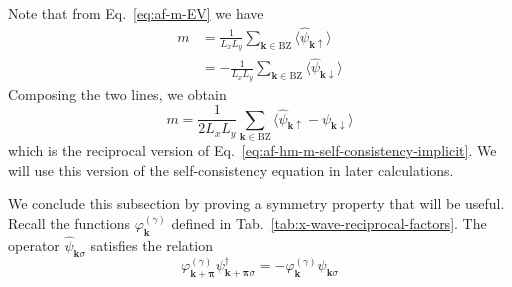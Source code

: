 Note that from Eq.~\eqref{eq:af-m-EV} we have
\begin{align}
	m &= \frac{1}{L_xL_y} \sum_{\mathbf{k}\in\mathrm{BZ}} \langle \hat \psi_{\mathbf{k}\uparrow} \rangle \label{eq:af-m-EV-up}\\
	&= -\frac{1}{L_xL_y} \sum_{\mathbf{k}\in\mathrm{BZ}} \langle \hat \psi_{\mathbf{k}\downarrow} \rangle \label{eq:af-m-EV-down}
\end{align}
Composing the two lines, we obtain
\begin{equation}
	m = \frac{1}{2L_xL_y} \sum_{\mathbf{k}\in\mathrm{BZ}} \langle \hat \psi_{\mathbf{k}\uparrow} - \psi_{\mathbf{k}\downarrow} \rangle \label{eq:af-hm-m-self-consistency-reciprocal}
\end{equation}
which is the reciprocal version of Eq.~\eqref{eq:af-hm-m-self-consistency-implicit}. We will use this version of the self-consistency equation in later calculations.

We conclude this subsection by proving a symmetry property that will be useful. Recall the functions $\varphi_\mathbf{k}^{(\gamma)}$ defined in Tab.~\ref{tab:x-wave-reciprocal-factors}. 
The operator $\hat \psi_{\mathbf{k}\sigma}$ satisfies the relation
\begin{equation}\label{eq:af-ehm-vphi-psi-property}
	\varphi_{\mathbf{k}+\bm{\pi}}^{(\gamma)} \psi_{\mathbf{k}+\bm{\pi}\sigma}^\dagger = - \varphi_\mathbf{k}^{(\gamma)} \psi_{\mathbf{k}\sigma}
\end{equation}

